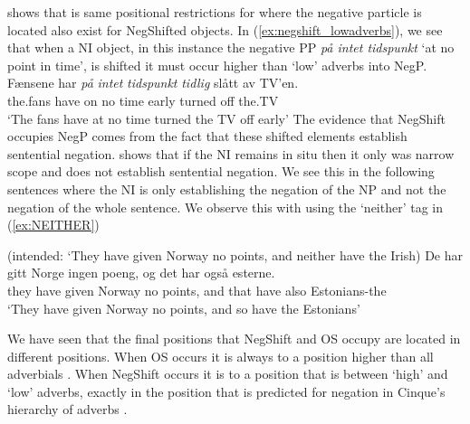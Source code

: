 \documentclass[12pt, letterpaper]{article}
\begin{document}
\citet{svenoniusStrainsNegationNorwegian2002} shows that is same positional restrictions for where the negative particle is located also exist for NegShifted objects. In (\ref{ex:negshift_lowadverbs}), we see that when a NI object, in this instance the negative PP \emph{på intet tidspunkt} `at no point in time', is shifted it must occur higher than `low' adverbs into NegP.  
\ea \label{ex:negshift_lowadverbs}
	\ea 
	\gll Fænsene har \emph{på} \emph{intet} \emph{tidspunkt} \emph{tidlig} slått av TV’en.\\
	the.fans have on no time early turned off the.TV\\
	\glt `The fans have at no time turned the TV off early’ 
	\z  
\z
The evidence that NegShift occupies NegP comes from the fact that these shifted elements establish sentential negation. \citet{svenoniusStrainsNegationNorwegian2002} shows that if the NI remains in situ then it only was narrow scope and does not establish sentential negation. We see this in the following sentences where the NI is only establishing the negation of the NP and not the negation of the whole sentence. We observe this with using the `neither' tag in (\ref{ex:NEITHER})

\ea 
	\glt (intended: ‘They have given Norway no points, and neither have the Irish) \label{ex:NEITHER}
	\ex 
	\gll De har gitt Norge ingen poeng, og det har også esterne.\\
	they have given Norway no points, and that have also Estonians-the\\
	\glt `They have given Norway no points, and so have the Estonians'
	\z 
\z  


We have seen that the final positions that NegShift and OS occupy are located in different positions. When OS occurs it is always to a position higher than all adverbials \citep{holmbergWordOrderSyntactic1986,holmbergRemarksHolmbergGeneralization1999}. When NegShift occurs it is to a position that is between `high' and `low' adverbs, exactly in the position that is predicted for negation in Cinque's hierarchy of adverbs \citep{nilsenAdverbsAshift1997,svenoniusStrainsNegationNorwegian2002}. 
\end{document}
